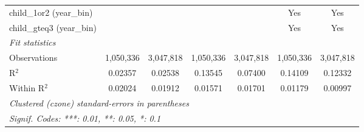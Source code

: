 \begin{tabular}{lcccccc}
child\_1or2 (year\_bin) &  &  &  &  & Yes & Yes\\
child\_gteq3 (year\_bin) &  &  &  &  & Yes & Yes\\
\midrule \emph{Fit statistics}&  & & & & & \\
Observations & 1,050,336&3,047,818&1,050,336&3,047,818&1,050,336&3,047,818\\
R$^2$ & 0.02357&0.02538&0.13545&0.07400&0.14109&0.12332\\
Within R$^2$ & 0.02024&0.01912&0.01571&0.01701&0.01179&0.00997\\
\midrule\midrule\multicolumn{7}{l}{\emph{Clustered (czone) standard-errors in parentheses}}\\
\multicolumn{7}{l}{\emph{Signif. Codes: ***: 0.01, **: 0.05, *: 0.1}}\\
\end{tabular}


